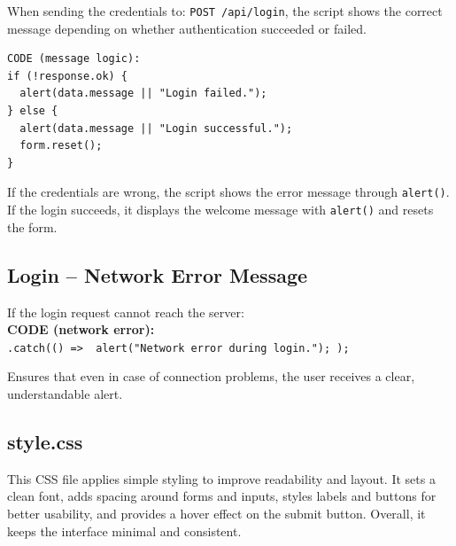 \documentclass[11pt,a4paper]{report}
\begin{document}
When sending the credentials to: \texttt{POST /api/login},
the script shows the correct message depending on whether authentication succeeded or failed.
\begin{lstlisting}
CODE (message logic):
if (!response.ok) {
  alert(data.message || "Login failed.");
} else {
  alert(data.message || "Login successful.");
  form.reset();
}
\end{lstlisting}

If the credentials are wrong, the script shows the error message through \texttt{alert()}. If the login succeeds, it displays the welcome message with \texttt{alert()} and resets the form.

\subsection{Login – Network Error Message}

If the login request cannot reach the server:\\
\textbf{CODE (network error):}\\
\texttt{.catch(() => { alert("Network error during login."); });}

Ensures that even in case of connection problems, the user receives a clear, understandable alert.

\subsection{style.css}
This CSS file applies simple styling to improve readability and layout. It sets a clean font, adds spacing around forms and inputs, styles labels and buttons for better usability, and provides a hover effect on the submit button. Overall, it keeps the interface minimal and consistent.
\end{document}
